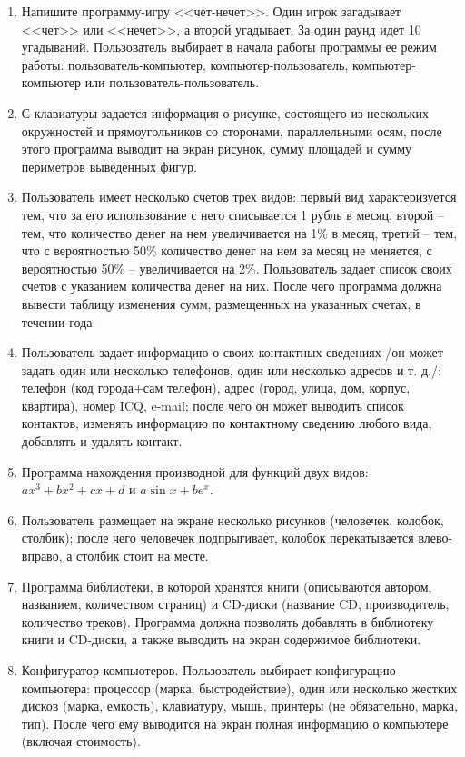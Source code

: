 \documentclass[12pt]{article}
\begin{document}
\begin{enumerate}
\item Напишите программу-игру <<чет-нечет>>. Один игрок загадывает <<чет>> или <<нечет>>, а второй угадывает. За один раунд 
идет 10 угадываний. Пользователь выбирает в начала работы программы ее режим работы: пользователь-компьютер,
компьютер-пользователь, компьютер-компьютер или пользователь-пользователь.
\item С клавиатуры задается информация о рисунке, состоящего из нескольких окружностей и прямоугольников со сторонами,
параллельными осям, после этого программа выводит на экран рисунок, сумму площадей и сумму периметров выведенных фигур.
\item Пользователь имеет несколько счетов трех видов: первый вид характеризуется тем, что за его использование с него списывается 1
рубль в месяц, второй -- тем, что количество денег на нем увеличивается на 1\% в месяц,
третий -- тем, что с вероятностью 50\% количество денег на нем за месяц не меняется, с вероятностью 50\% --
увеличивается на 2\%. Пользователь задает список своих счетов с указанием количества денег на них. После чего
программа должна вывести таблицу изменения сумм, размещенных на указанных счетах, в течении года.
\item Пользователь задает информацию о своих контактных сведениях /он может задать один или несколько
телефонов, один или несколько адресов и т. д./: телефон (код города+сам телефон), адрес (город, улица, дом,
корпус, квартира), номер ICQ, e-mail; после чего он может выводить список контактов, изменять информацию
по контактному сведению любого вида, добавлять и удалять контакт.
\item Программа нахождения производной для функций двух видов: $ax^3+bx^2+cx+d$ и $a\sin x+ be^x$.
\item Пользователь размещает на экране несколько рисунков (человечек, колобок, столбик); после чего человечек
подпрыгивает, колобок перекатывается влево-вправо, а столбик стоит на месте.
 \item Программа библиотеки, в которой хранятся книги (описываются автором, названием, количеством страниц) и
CD-диски (название CD, производитель, количество треков). Программа должна позволять добавлять в библиотеку книги и 
CD-диски, а также выводить на экран содержимое библиотеки.
\item Конфигуратор компьютеров. Пользователь выбирает конфигурацию компьютера: процессор (марка, быстродействие), 
один или несколько жестких дисков (марка, емкость), клавиатуру, мышь, принтеры (не обязательно, марка, тип). После
чего ему выводится на экран полная информацию о компьютере (включая стоимость).

\end{enumerate}
\end{document}
